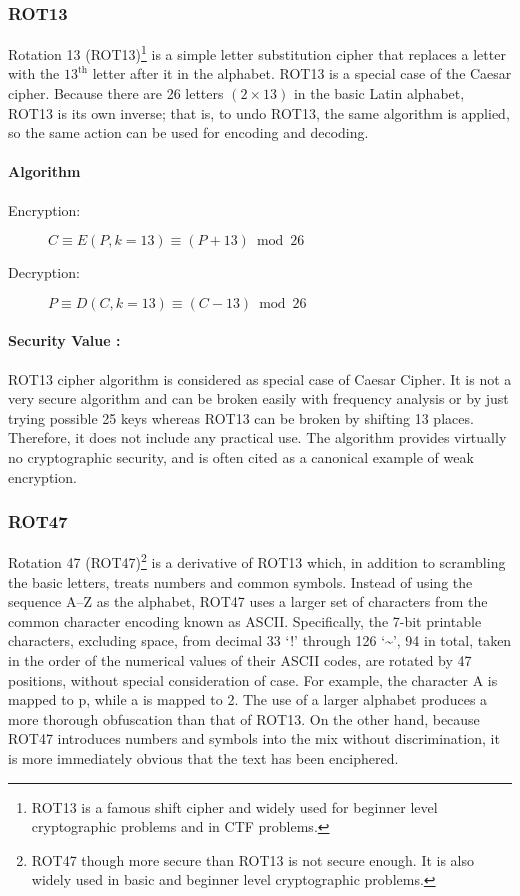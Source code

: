 \documentclass[british]{article}
\begin{document}
\subsubsection{ROT13}

Rotation 13 (ROT13)\footnote{ROT13 is a famous shift cipher and widely used for beginner level
	cryptographic problems and in CTF problems.} is a simple letter substitution cipher that replaces a letter with
the $13^{\text{th}}$ letter after it in the alphabet. ROT13 is a
special case of the Caesar cipher. Because there are 26 letters $(2\times13)$
in the basic Latin alphabet, ROT13 is its own inverse; that is, to
undo ROT13, the same algorithm is applied, so the same action can
be used for encoding and decoding.

\paragraph{Algorithm}
\begin{description}
	\item [{Encryption:}] $C\equiv E(P,k=13)\equiv(P+13)\bmod26$
	\item [{Decryption:}] $P\equiv D(C,k=13)\equiv(C-13)\bmod26$
\end{description}

\paragraph{Security Value : }

ROT13 cipher algorithm is considered as special case of Caesar Cipher.
It is not a very secure algorithm and can be broken easily with frequency
analysis or by just trying possible 25 keys whereas ROT13 can be broken
by shifting 13 places. Therefore, it does not include any practical
use. The algorithm provides virtually no cryptographic security, and
is often cited as a canonical example of weak encryption.

\subsubsection{ROT47}

Rotation 47 (ROT47)\footnote{ROT47 though more secure than ROT13 is not secure enough. It is also
	widely used in basic and beginner level cryptographic problems.} is a derivative of ROT13 which, in addition to scrambling the basic
letters, treats numbers and common symbols. Instead of using the sequence
A--Z as the alphabet, ROT47 uses a larger set of characters from
the common character encoding known as ASCII. Specifically, the 7-bit
printable characters, excluding space, from decimal 33 `!' through
126 `\textasciitilde ', 94 in total, taken in the order of the
numerical values of their ASCII codes, are rotated by 47 positions,
without special consideration of case. For example, the character
A is mapped to p, while a is mapped to 2. The use of a larger alphabet
produces a more thorough obfuscation than that of ROT13. On the other
hand, because ROT47 introduces numbers and symbols into the mix without
discrimination, it is more immediately obvious that the text has been
enciphered.
\end{document}
